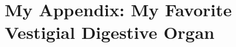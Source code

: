 \documentclass[capstoc,capschap]{rpisudiss}
\begin{document}
\frontmatter

\tableofcontents

\mainmatter %

\appendix

\chapter{My Appendix: My Favorite Vestigial Digestive Organ}
\blindtext
\end{document}
